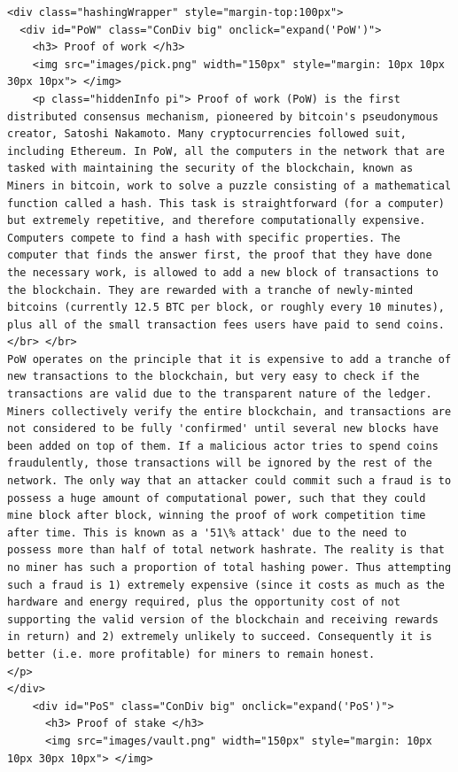 \begin{lstlisting}
<div class="hashingWrapper" style="margin-top:100px">
  <div id="PoW" class="ConDiv big" onclick="expand('PoW')">
    <h3> Proof of work </h3>
    <img src="images/pick.png" width="150px" style="margin: 10px 10px 30px 10px"> </img>
    <p class="hiddenInfo pi"> Proof of work (PoW) is the first distributed consensus mechanism, pioneered by bitcoin's pseudonymous creator, Satoshi Nakamoto. Many cryptocurrencies followed suit, including Ethereum. In PoW, all the computers in the network that are tasked with maintaining the security of the blockchain, known as Miners in bitcoin, work to solve a puzzle consisting of a mathematical function called a hash. This task is straightforward (for a computer) but extremely repetitive, and therefore computationally expensive. Computers compete to find a hash with specific properties. The computer that finds the answer first, the proof that they have done the necessary work, is allowed to add a new block of transactions to the blockchain. They are rewarded with a tranche of newly-minted bitcoins (currently 12.5 BTC per block, or roughly every 10 minutes), plus all of the small transaction fees users have paid to send coins.
</br> </br>
PoW operates on the principle that it is expensive to add a tranche of new transactions to the blockchain, but very easy to check if the transactions are valid due to the transparent nature of the ledger. Miners collectively verify the entire blockchain, and transactions are not considered to be fully 'confirmed' until several new blocks have been added on top of them. If a malicious actor tries to spend coins fraudulently, those transactions will be ignored by the rest of the network. The only way that an attacker could commit such a fraud is to possess a huge amount of computational power, such that they could mine block after block, winning the proof of work competition time after time. This is known as a '51\% attack' due to the need to possess more than half of total network hashrate. The reality is that no miner has such a proportion of total hashing power. Thus attempting such a fraud is 1) extremely expensive (since it costs as much as the hardware and energy required, plus the opportunity cost of not supporting the valid version of the blockchain and receiving rewards in return) and 2) extremely unlikely to succeed. Consequently it is better (i.e. more profitable) for miners to remain honest.
</p>
</div>
    <div id="PoS" class="ConDiv big" onclick="expand('PoS')">
      <h3> Proof of stake </h3>
      <img src="images/vault.png" width="150px" style="margin: 10px 10px 30px 10px"> </img>

\end{lstlisting}
